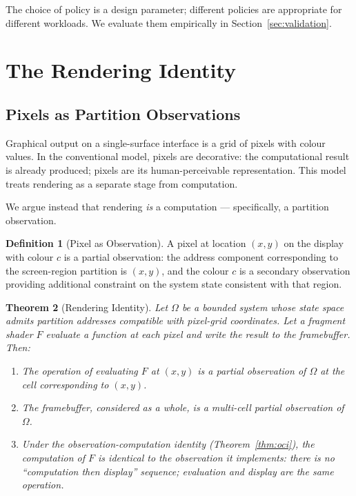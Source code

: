 \documentclass[11pt,twocolumn,a4paper]{article}
\newtheorem{theorem}{Theorem}[section]
\theoremstyle{definition}
\newtheorem{definition}[theorem]{Definition}
\theoremstyle{remark}
\begin{document}
The choice of policy is a design parameter; different policies are appropriate for different workloads. We evaluate them empirically in Section~\ref{sec:validation}.

\section{The Rendering Identity}
\label{sec:rendering}

\subsection{Pixels as Partition Observations}

Graphical output on a single-surface interface is a grid of pixels with colour values. In the conventional model, pixels are decorative: the computational result is already produced; pixels are its human-perceivable representation. This model treats rendering as a separate stage from computation.

We argue instead that rendering \emph{is} a computation --- specifically, a partition observation.

\begin{definition}[Pixel as Observation]
\label{def:pixel}
A pixel at location $(x, y)$ on the display with colour $c$ is a partial observation: the address component corresponding to the screen-region partition is $(x, y)$, and the colour $c$ is a secondary observation providing additional constraint on the system state consistent with that region.
\end{definition}

\begin{theorem}[Rendering Identity]
\label{thm:render-id}
Let $\Omega$ be a bounded system whose state space admits partition addresses compatible with pixel-grid coordinates. Let a fragment shader $F$ evaluate a function at each pixel and write the result to the framebuffer. Then:
\begin{enumerate}
    \item The operation of evaluating $F$ at $(x,y)$ is a partial observation of $\Omega$ at the cell corresponding to $(x,y)$.
    \item The framebuffer, considered as a whole, is a multi-cell partial observation of $\Omega$.
    \item Under the observation-computation identity (Theorem~\ref{thm:oci}), the computation of $F$ is identical to the observation it implements: there is no ``computation then display'' sequence; evaluation and display are the same operation.
\end{enumerate}
\end{theorem}
\end{document}
